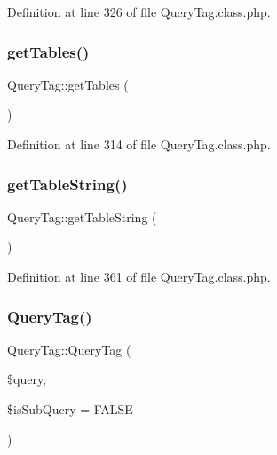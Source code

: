 Definition at line 326 of file Query\+Tag.\+class.\+php.

\hypertarget{classQueryTag_a016b987e8e488622f64a89b40de7109f}{}\label{classQueryTag_a016b987e8e488622f64a89b40de7109f} 
\subsubsection{\texorpdfstring{get\+Tables()}{getTables()}}
{\footnotesize\ttfamily Query\+Tag\+::get\+Tables (\begin{DoxyParamCaption}{ }\end{DoxyParamCaption})}



Definition at line 314 of file Query\+Tag.\+class.\+php.

\hypertarget{classQueryTag_a62814037e62c4b29f53f6b9a9d677e17}{}\label{classQueryTag_a62814037e62c4b29f53f6b9a9d677e17} 
\subsubsection{\texorpdfstring{get\+Table\+String()}{getTableString()}}
{\footnotesize\ttfamily Query\+Tag\+::get\+Table\+String (\begin{DoxyParamCaption}{ }\end{DoxyParamCaption})}



Definition at line 361 of file Query\+Tag.\+class.\+php.

\hypertarget{classQueryTag_a1f7df91f1227af5dabcdcc10abe88989}{}\label{classQueryTag_a1f7df91f1227af5dabcdcc10abe88989} 
\subsubsection{\texorpdfstring{Query\+Tag()}{QueryTag()}}
{\footnotesize\ttfamily Query\+Tag\+::\+Query\+Tag (\begin{DoxyParamCaption}\item[{}]{\$query,  }\item[{}]{\$is\+Sub\+Query = {\ttfamily FALSE} }\end{DoxyParamCaption})}

